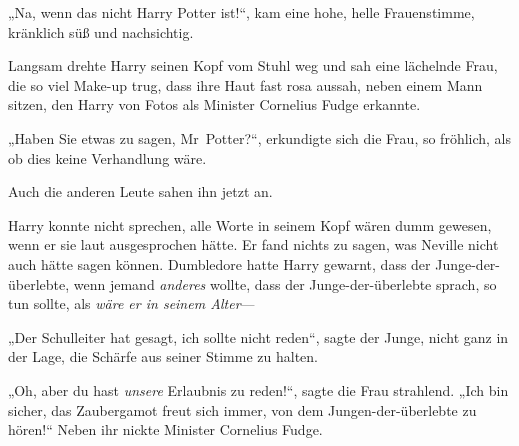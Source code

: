 „Na, wenn das nicht Harry Potter ist!“, kam eine hohe, helle Frauenstimme, kränklich süß und nachsichtig.

Langsam drehte Harry seinen Kopf vom Stuhl weg und sah eine lächelnde Frau, die so viel Make-up trug, dass ihre Haut fast rosa aussah, neben einem Mann sitzen, den Harry von Fotos als Minister Cornelius Fudge erkannte.

„Haben Sie etwas zu sagen, Mr~Potter?“, erkundigte sich die Frau, so fröhlich, als ob dies keine Verhandlung wäre.

Auch die anderen Leute sahen ihn jetzt an.

Harry konnte nicht sprechen, alle Worte in seinem Kopf wären dumm gewesen, wenn er sie laut ausgesprochen hätte. Er fand nichts zu sagen, was Neville nicht auch hätte sagen können. Dumbledore hatte Harry gewarnt, dass der Junge-der-überlebte, wenn jemand \emph{anderes} wollte, dass der Junge-der-überlebte sprach, so tun sollte, als \emph{wäre er in seinem Alter}—

„Der Schulleiter hat gesagt, ich sollte nicht reden“, sagte der Junge, nicht ganz in der Lage, die Schärfe aus seiner Stimme zu halten.

„Oh, aber du hast \emph{unsere} Erlaubnis zu reden!“, sagte die Frau strahlend. „Ich bin sicher, das Zaubergamot freut sich immer, von dem Jungen-der-überlebte zu hören!“
Neben ihr nickte Minister Cornelius Fudge.

